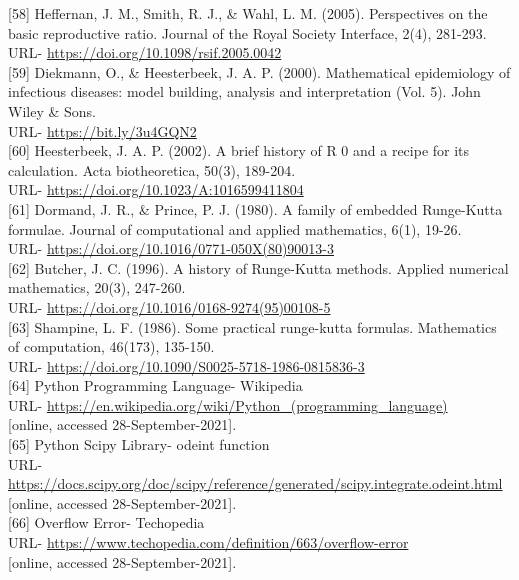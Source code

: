 [58] Heffernan, J. M., Smith, R. J., \& Wahl, L. M. (2005). Perspectives on the basic reproductive ratio. Journal of the Royal Society Interface, 2(4), 281-293. \\
URL- \url{https://doi.org/10.1098/rsif.2005.0042} \\

[59] Diekmann, O., \& Heesterbeek, J. A. P. (2000). Mathematical epidemiology of infectious diseases: model building, analysis and interpretation (Vol. 5). John Wiley \& Sons. \\
URL- \url{https://bit.ly/3u4GQN2} \\

[60] Heesterbeek, J. A. P. (2002). A brief history of R 0 and a recipe for its calculation. Acta biotheoretica, 50(3), 189-204. \\
URL- \url{https://doi.org/10.1023/A:1016599411804} \\

[61] Dormand, J. R., \& Prince, P. J. (1980). A family of embedded Runge-Kutta formulae. Journal of computational and applied mathematics, 6(1), 19-26. \\
URL- \url{https://doi.org/10.1016/0771-050X(80)90013-3} \\

[62] Butcher, J. C. (1996). A history of Runge-Kutta methods. Applied numerical mathematics, 20(3), 247-260. \\
URL- \url{https://doi.org/10.1016/0168-9274(95)00108-5} \\

[63] Shampine, L. F. (1986). Some practical runge-kutta formulas. Mathematics of computation, 46(173), 135-150. \\
URL- \url{https://doi.org/10.1090/S0025-5718-1986-0815836-3} \\

[64] Python Programming Language- Wikipedia\\
URL- \url{https://en.wikipedia.org/wiki/Python_(programming_language)}\\
{[online, accessed 28-September-2021]}.\\

[65] Python Scipy Library- odeint function\\
URL- \url{https://docs.scipy.org/doc/scipy/reference/generated/scipy.integrate.odeint.html}\\
{[online, accessed 28-September-2021]}.\\

[66] Overflow Error- Techopedia\\
URL- \url{https://www.techopedia.com/definition/663/overflow-error}\\
{[online, accessed 28-September-2021]}.\\